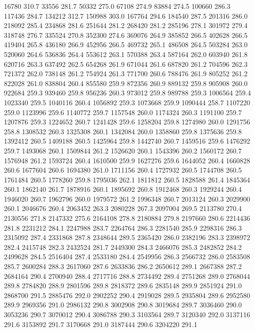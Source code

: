 16780 310.7
33556 281.7
50332 275.0
67108 274.9
83884 274.5
100660 286.3
117436 284.7
134212 312.7
150988 303.0
167764 294.6
184540 287.5
201316 286.0
218092 285.4
234868 281.6
251644 281.2
268420 281.2
285196 278.1
301972 279.4
318748 276.7
335524 270.8
352300 274.6
369076 264.9
385852 266.5
402628 266.5
419404 265.8
436180 266.9
452956 266.5
469732 265.1
486508 264.5
503284 263.0
520060 264.6
536836 264.4
553612 263.1
570388 263.4
587164 262.0
603940 261.8
620716 263.3
637492 262.5
654268 261.9
671044 261.6
687820 261.2
704596 262.3
721372 262.0
738148 261.2
754924 261.3
771700 260.6
788476 261.9
805252 261.2
822028 261.0
838804 260.4
855580 259.9
872356 260.9
889132 259.8
905908 260.0
922684 259.3
939460 259.8
956236 260.3
973012 259.8
989788 259.3
1006564 259.4
1023340 259.5
1040116 260.4
1056892 259.3
1073668 259.9
1090444 258.7
1107220 259.0
1123996 259.6
1140772 259.7
1157548 260.0
1174324 260.3
1191100 259.7
1207876 259.3
1224652 260.7
1241428 259.6
1258204 259.8
1274980 260.0
1291756 258.8
1308532 260.3
1325308 260.1
1342084 260.0
1358860 259.8
1375636 259.8
1392412 260.5
1409188 260.5
1425964 259.8
1442740 260.7
1459516 259.6
1476292 259.7
1493068 260.1
1509844 261.2
1526620 260.1
1543396 260.2
1560172 260.7
1576948 261.2
1593724 260.4
1610500 259.9
1627276 259.6
1644052 260.4
1660828 260.6
1677604 260.6
1694380 261.0
1711156 260.4
1727932 260.5
1744708 260.5
1761484 260.5
1778260 259.8
1795036 262.1
1811812 260.5
1828588 261.4
1845364 260.1
1862140 261.7
1878916 260.1
1895692 260.8
1912468 260.3
1929244 260.4
1946020 260.7
1962796 260.0
1979572 261.2
1996348 260.7
2013124 260.3
2029900 260.1
2046676 260.4
2063452 263.3
2080228 267.3
2097004 269.5
2113780 270.4
2130556 271.8
2147332 275.6
2164108 278.8
2180884 279.8
2197660 280.6
2214436 281.8
2231212 284.1
2247988 283.7
2264764 286.3
2281540 285.9
2298316 286.3
2315092 287.4
2331868 287.8
2348644 289.5
2365420 286.0
2382196 283.3
2398972 282.4
2415748 282.3
2432524 281.7
2449300 284.3
2466076 285.3
2482852 284.2
2499628 284.5
2516404 287.4
2533180 284.4
2549956 286.3
2566732 286.0
2583508 285.7
2600284 288.3
2617060 287.6
2633836 286.2
2650612 289.1
2667388 287.2
2684164 290.4
2700940 288.4
2717716 288.8
2734492 289.4
2751268 289.0
2768044 289.8
2784820 288.9
2801596 289.8
2818372 289.6
2835148 289.9
2851924 291.0
2868700 291.5
2885476 292.0
2902252 290.4
2919028 289.5
2935804 289.6
2952580 289.9
2969356 291.0
2986132 290.8
3002908 290.8
3019684 289.7
3036460 290.0
3053236 290.7
3070012 290.4
3086788 290.3
3103564 289.7
3120340 292.0
3137116 291.6
3153892 291.7
3170668 291.0
3187444 290.6
3204220 291.1
